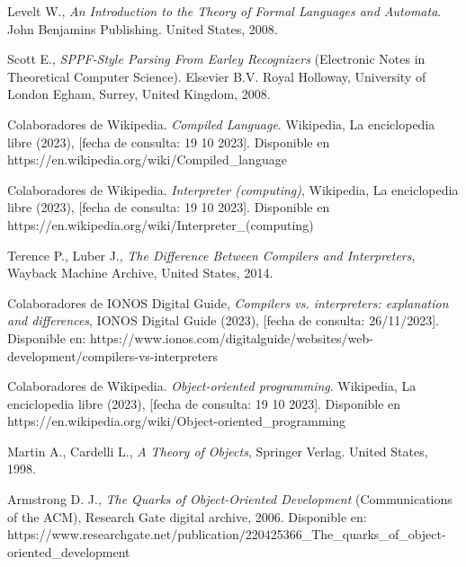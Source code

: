 \begin{thebibliography}{11}
    \bibitem{}
    \label{sec:41}
    \hypertarget{41}{}
    Levelt W., \textit{An Introduction to the Theory of Formal Languages and Automata}. John Benjamins Publishing. United States, 2008.

    \bibitem{}
    \label{sec:42}
    \hypertarget{42}{}
    Scott E., \textit{SPPF-Style Parsing From Earley Recognizers} (Electronic Notes in Theoretical Computer Science). Elsevier B.V. Royal Holloway, University of London
    Egham, Surrey, United Kingdom, 2008. %

    \bibitem{}
    \label{sec:43}
    \hypertarget{43}{}
    Colaboradores de Wikipedia. \textit{Compiled Language}. Wikipedia, La enciclopedia libre (2023), [fecha de consulta: 19 10 2023]. Disponible en https://en.wikipedia.org/wiki/Compiled\_language

    \bibitem{}
    \label{sec:44}
    \hypertarget{44}{}
    Colaboradores de Wikipedia. \textit{Interpreter (computing)}, Wikipedia, La enciclopedia libre (2023), [fecha de consulta: 19 10 2023]. Disponible en https://en.wikipedia.org/wiki/Interpreter\_(computing)

    \bibitem{}
    \label{sec:45}
    \hypertarget{45}{}
    Terence P., Luber J., \textit{The Difference Between Compilers and Interpreters},  Wayback Machine Archive, United States, 2014.

    \bibitem{}
    \label{sec:46}
    \hypertarget{46}{}
    Colaboradores de IONOS Digital Guide, \textit{Compilers vs. interpreters: explanation and differences}, IONOS Digital Guide (2023), [fecha de consulta: 26/11/2023]. Disponible en: https://www.ionos.com/digitalguide/websites/web-development/compilers-vs-interpreters

    \bibitem{}
    \label{sec:47}
    \hypertarget{47}{}
    Colaboradores de Wikipedia. \textit{Object-oriented programming}. Wikipedia, La enciclopedia libre (2023), [fecha de consulta: 19 10 2023]. Disponible en https://en.wikipedia.org/wiki/Object-oriented\_programming

    \bibitem{}
    \label{sec:48}
    \hypertarget{48}{}
    Martin A., Cardelli L.,  \textit{A Theory of Objects}, Springer Verlag. United States, 1998.

    \bibitem{}
    \label{sec:49}
    \hypertarget{49}{}
    Armstrong D. J., \textit{The Quarks of Object-Oriented Development}  (Communications of the ACM), Research Gate digital archive, 2006. Disponible en: https://www.researchgate.net/publication/220425366\_The\_quarks\_of\_object-oriented\_development%


\end{thebibliography}
